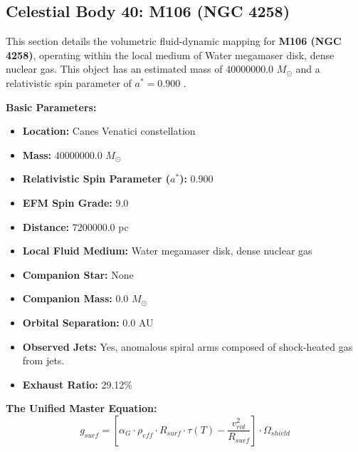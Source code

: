 \documentclass[11pt, a4paper]{article}
\begin{document}
\clearpage
\subsection{Celestial Body 40: M106 (NGC 4258)}
This section details the volumetric fluid-dynamic mapping for \textbf{M106 (NGC 4258)}, operating within the local medium of Water megamaser disk, dense nuclear gas. This object has an estimated mass of 40000000.0 $M_{\odot}$ and a relativistic spin parameter of $a^* = 0.900$ \cite{miyoshi1995, ned}.

\vspace{0.5em}
\noindent \textbf{Basic Parameters:}
\begin{itemize}
  \item \textbf{Location:} Canes Venatici constellation
  \item \textbf{Mass:} 40000000.0 $M_{\odot}$
  \item \textbf{Relativistic Spin Parameter ($a^*$):} 0.900
  \item \textbf{EFM Spin Grade:} 9.0
  \item \textbf{Distance:} 7200000.0 pc
  \item \textbf{Local Fluid Medium:} Water megamaser disk, dense nuclear gas
  \item \textbf{Companion Star:} None
  \item \textbf{Companion Mass:} 0.0 $M_{\odot}$
  \item \textbf{Orbital Separation:} 0.0 AU
  \item \textbf{Observed Jets:} Yes, anomalous spiral arms composed of shock-heated gas from jets.
  \item \textbf{Exhaust Ratio:} 29.12\%
\end{itemize}

\vspace{0.5em}
\noindent \textbf{The Unified Master Equation:}
$$ g_{surf} = \left[ \alpha_G \cdot \rho_{eff} \cdot R_{surf} \cdot \tau(T) - \frac{v_{rot}^2}{R_{surf}} \right] \cdot \Omega_{shield} $$
\end{document}
